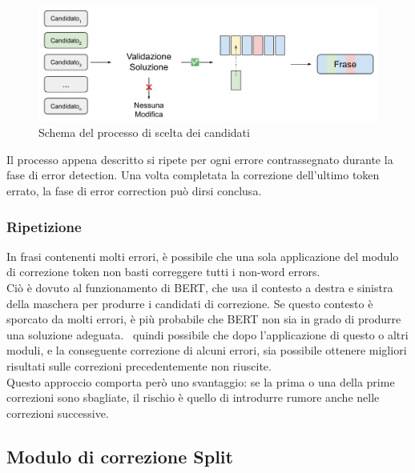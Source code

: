 \begin{figure}[H]
\centering
\includegraphics[width=\textwidth]{immagini/metodologia/scelta_candidati}
\caption{Schema del processo di scelta dei candidati}
\label{fig:met_pick}
\end{figure}
Il processo appena descritto si ripete per ogni errore contrassegnato durante la fase di error detection. Una volta completata la correzione dell'ultimo token errato, la fase di error correction può dirsi conclusa.

\subsubsection{Ripetizione}
In frasi contenenti molti errori, è possibile che una sola applicazione del modulo di correzione token non basti correggere tutti i non-word errors.\\
Ciò è dovuto al funzionamento di BERT, che usa il contesto a destra e sinistra della maschera per produrre i candidati di correzione. Se questo contesto è sporcato da molti errori, è più probabile che BERT non sia in grado di produrre una soluzione adeguata. \E\ quindi possibile che dopo l'applicazione di questo o altri moduli, e la conseguente correzione di alcuni errori, sia possibile ottenere migliori risultati sulle correzioni precedentemente non riuscite.\\
Questo approccio comporta però uno svantaggio: se la prima o una della prime correzioni sono sbagliate, il rischio è quello di introdurre rumore anche nelle correzioni successive.

\subsection{Modulo di correzione Split}
\label{sec:met_mod_split}

